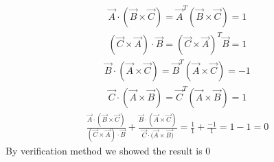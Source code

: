 \documentclass[journal]{IEEEtran}
\begin{document}
\begin{align}
\vec{A} \cdot(\vec{B}\times\vec{C})=\vec{A}^T(\vec{B}\times\vec{C})=1\
\end{align}
\begin{align}
(\vec{C} \times \vec{A}) \cdot \vec{B}=(\vec{C} \times \vec{A})^T\vec{B}=1\
\end{align}
\begin{align}
\vec{B} \cdot(\vec{A}\times \vec{C})=\vec{B}^T(\vec{A}\times \vec{C})=-1\
\end{align}
\begin{align}
 \vec{C} \cdot (\vec{A} \times \vec{B})= \vec{C}^T (\vec{A} \times \vec{B})=1\ 
\end{align}
\begin{align}
\frac{\vec{A} \cdot(\vec{B}\times\vec{C})}{(\vec{C} \times \vec{A}) \cdot \vec{B}}
+ \frac{\vec{B} \cdot(\vec{A}\times \vec{C})}{\vec{C} \cdot (\vec{A} \times \vec{B)}}
= \frac{1}{1}+\frac{-1}{1}=1-1=0\
\end{align}
By verification method we showed the result is 0
\end{document}
